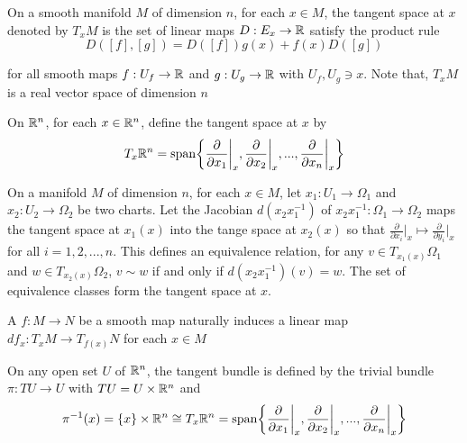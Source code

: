 \begin{definition}
	On a smooth manifold $M$ of dimension $n$, for each $x \in M$, the tangent space at $x$ denoted by $T_x M$ is the set of linear maps $D: E_x \to \mathbb{R}$ satisfy the product rule
	$$
		D([f], [g]) = D([f]) g(x) + f(x) D([g])
	$$
	
	for all smooth maps $f: U_f \to \mathbb{R}$ and $g: U_g \to \mathbb{R}$ with $U_f, U_g \ni x$. Note that, $T_x M$ is a real vector space of dimension $n$
\end{definition}

\begin{remark}
	On $\mathbb{R}^n$, for each $x \in \mathbb{R}^n$, define the tangent space at $x$ by
	$$
		T_x \R^n = \Span \set*{\frac{\partial}{\partial x_1}\bigg\vert_{x}, \frac{\partial}{\partial x_2}\bigg\vert_{x}, ..., \frac{\partial}{\partial x_n}\bigg\vert_{x}}
	$$
	
	On a manifold $M$ of dimension $n$, for each $x \in M$, let $x_1: U_1 \to \Omega_1$ and $x_2: U_2 \to \Omega_2$ be two charts. Let the Jacobian $d(x_2 x_1^{-1})$ of $x_2 x_1^{-1}: \Omega_1 \to \Omega_2$ maps the tangent space at $x_1(x)$ into the tange space at $x_2(x)$ so that $\frac{\partial}{\partial x_i}\bigg\vert_x \mapsto \frac{\partial}{\partial y_i}\bigg\vert_x$ for all $i=1, 2, ..., n$.  This defines an equivalence relation, for any $v \in T_{x_1(x)} \Omega_1$ and $w \in T_{x_2(x)} \Omega_2$, $v \sim w$ if and only if $d(x_2 x_1^{-1})(v) = w$. The set of equivalence classes form the tangent space at $x$.
\end{remark}

\begin{definition}[differential]
	A $f: M \to N$ be a smooth map naturally induces a linear map $df_x: T_x M \to T_{f(x)} N$ for each $x \in M$
\end{definition}

\begin{remark}
	On any open set $U$ of $\mathbb{R}^n$, the tangent bundle is defined by the trivial bundle $\pi: TU \to U$ with $TU = U \times \mathbb{R}^n$ and
	$$
		\pi^{-1}(x) = \set{x} \times \R^n \cong T_x \R^n = \Span \set*{\frac{\partial}{\partial x_1}\bigg\vert_{x}, \frac{\partial}{\partial x_2}\bigg\vert_{x}, ..., \frac{\partial}{\partial x_n}\bigg\vert_{x}}
	$$
\end{remark}

